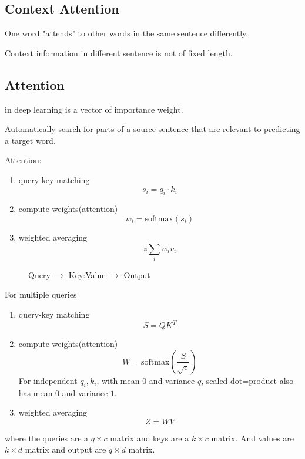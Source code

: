 \subsection{Context Attention}
One word "attends" to other words in the same sentence differently.

Context information in different sentence is not of fixed length.


\subsection{Attention}
 in deep learning is a vector of importance weight.

Automatically search for parts of a source sentence that are relevant to predicting a target word.

Attention:
\begin{enumerate}
    \item query-key matching
    \[s_i=q_i\cdot k_i\]
    \item compute weights(attention)
    \[ w_i=\mathrm{softmax}(s_i)\]
    \item weighted averaging 
    \[z\sum_{i}w_iv_i\]
\end{enumerate}
\begin{figure}[htbp]
    \centering
    \caption{Query $\rightarrow$ Key:Value $\rightarrow$ Output}
    \label{fig:linked_list}
\end{figure}

For multiple queries 
\begin{enumerate}
    \item query-key matching
    \[S=QK^T\]
    \item compute weights(attention)
    \[W=\mathrm{softmax}(\frac{S}{\sqrt{c}})\]
    For independent  $ q_i,k_i  $, with mean  $ 0  $ and variance  $ q $,  scaled dot=product also has mean  $ 0  $ and variance  $ 1 $. 
    \item weighted averaging 
    \[Z=WV\]
\end{enumerate}
where the queries are a   $ q\times c $ matrix and keys are a   $ k\times c $ matrix. And values are  $ k\times d $ matrix and output are $ q\times d $ matrix.

